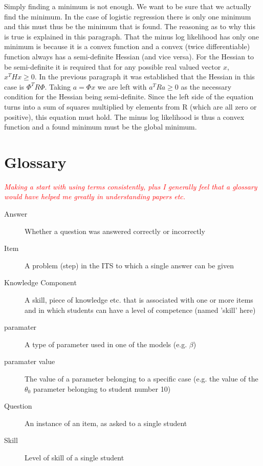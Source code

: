 \documentclass{scrartcl}
\newcommand\todo[1]{\textit{\textcolor{red}{#1}}}
\begin{document}
Simply finding a minimum is not enough. We want to be sure that we actually find the minimum. In the case of logistic regression there is only one minimum and this must thus be the minimum that is found. The reasoning as to why this is true is explained in this paragraph. That the minus log likelihood has only one minimum is because it is a convex function and a convex (twice differentiable) function always has a semi-definite Hessian (and vice versa). For the Hessian to be semi-definite it is required that for any possible real valued vector $x$, $x^{T}Hx\geq 0$. In the previous paragraph it was established that the Hessian in this case is $\Phi^{T} R \Phi$. Taking $a=\Phi x$ we are left with $a^{T}Ra\geq 0$ as the necessary condition for the Hessian being semi-definite. Since the left side of the equation turns into a sum of squares multiplied by elements from R (which are all zero or positive), this equation must hold. The minus log likelihood is thus a convex function and a found minimum must be the global minimum.


\pagebreak 
\section{Glossary}
\todo{
Making a start with using terms consistently, plus I generally feel that a glossary would have helped me greatly in understanding papers etc.}
\begin{description}
\item[Answer]Whether a question was answered correctly or incorrectly
  \item[Item] A problem (step) in the ITS to which a single answer can be given
  \item[Knowledge Component] A skill, piece of knowledge etc. that is associated with one or more items and in which students can have a level of competence (named 'skill' here)
  \item[paramater] A type of parameter used in one of the models (e.g. $\beta$)
  \item[paramater value] The value of a parameter belonging to a specific case (e.g. the value of the $\theta_{0}$ parameter belonging to student number 10)
  \item[Question] An instance of an item, as asked to a single student
  \item[Skill] Level of skill of a single student
\end{description}
\end{document}
